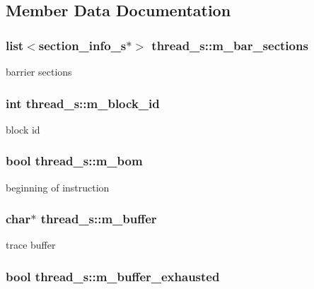 \subsection{Member Data Documentation}
\hypertarget{structthread__s_a854a6eb1c6bb1aacfdf3c24cf9b1a037}{
\subsubsection[{m\_\-bar\_\-sections}]{\setlength{\rightskip}{0pt plus 5cm}list$<${\bf section\_\-info\_\-s}$\ast$$>$ {\bf thread\_\-s::m\_\-bar\_\-sections}}}
\label{structthread__s_a854a6eb1c6bb1aacfdf3c24cf9b1a037}
barrier sections \hypertarget{structthread__s_ab3c9083e089fff4f6b97d39ed0ba4b51}{
\subsubsection[{m\_\-block\_\-id}]{\setlength{\rightskip}{0pt plus 5cm}int {\bf thread\_\-s::m\_\-block\_\-id}}}
\label{structthread__s_ab3c9083e089fff4f6b97d39ed0ba4b51}
block id \hypertarget{structthread__s_afae2ee7a8bd0adf9a6c544eed103c440}{
\subsubsection[{m\_\-bom}]{\setlength{\rightskip}{0pt plus 5cm}bool {\bf thread\_\-s::m\_\-bom}}}
\label{structthread__s_afae2ee7a8bd0adf9a6c544eed103c440}
beginning of instruction \hypertarget{structthread__s_a454df2fcda350ce8d6fde3ad01dddfcf}{
\subsubsection[{m\_\-buffer}]{\setlength{\rightskip}{0pt plus 5cm}char$\ast$ {\bf thread\_\-s::m\_\-buffer}}}
\label{structthread__s_a454df2fcda350ce8d6fde3ad01dddfcf}
trace buffer \hypertarget{structthread__s_ac6b1743df3ea0beb279fcccf9a2833df}{
\subsubsection[{m\_\-buffer\_\-exhausted}]{\setlength{\rightskip}{0pt plus 5cm}bool {\bf thread\_\-s::m\_\-buffer\_\-exhausted}}}
